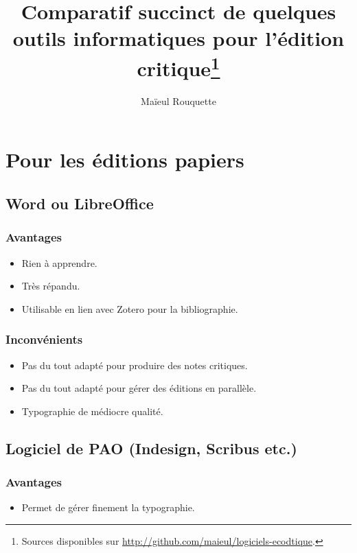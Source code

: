 \documentclass{article}
\begin{document}
\author{Maïeul Rouquette}
\title{Comparatif succinct de quelques outils informatiques pour l'édition critique\footnote{Sources disponibles sur \url{http://github.com/maieul/logiciels-ecodtique}.}}

\maketitle\thispagestyle{fancy}
\tableofcontents
\section{Pour les éditions papiers}
\subsection{Word ou LibreOffice}

\subsubsection{Avantages}
\begin{itemize}
	\item Rien à apprendre.
	\item Très répandu.
	\item Utilisable en lien avec Zotero pour la bibliographie.
\end{itemize}

\subsubsection{Inconvénients}
\begin{itemize}
	\item Pas du tout adapté pour produire des notes critiques.
	\item Pas du tout adapté pour gérer des éditions en parallèle.
	\item Typographie de médiocre qualité.
\end{itemize}

\subsection{Logiciel de PAO (Indesign, Scribus etc.)}

\subsubsection{Avantages}
\begin{itemize}
	\item Permet de gérer finement la typographie.
\end{itemize}
\end{document}
